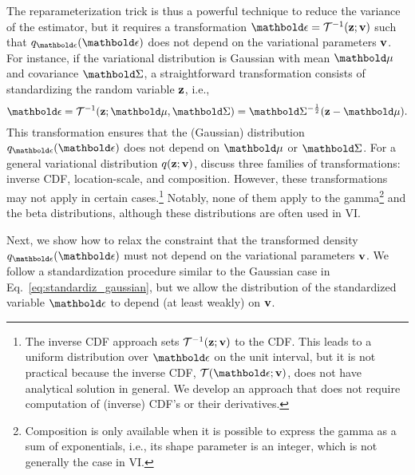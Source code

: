 The reparameterization trick is thus a powerful technique to reduce the variance of the estimator, but it requires a transformation $\beps=\Tcal^{-1}(\bz;\bv)$ such that $q_{\beps}(\beps)$ does not depend on the variational parameters $\mathbf{v}$. For instance, if the variational distribution is Gaussian with mean $\bmu$ and covariance $\bSigma$, a straightforward transformation consists of standardizing the random variable $\mathbf{z}$, i.e.,
\begin{equation}\label{eq:standardiz_gaussian}
	\beps=\Tcal^{-1}(\bz;\bmu,\bSigma)=\bSigma^{-\frac{1}{2}}(\bz-\bmu).
\end{equation}
This transformation ensures that the (Gaussian) distribution $q_{\beps}(\beps)$ does not depend on $\bmu$ or $\bSigma$. For a general variational distribution $q(\mathbf{z};\mathbf{v})$, \citet{Kingma2014} discuss three families of transformations: inverse \gls{CDF}, location-scale, and composition. However, these transformations may not apply in certain cases.\footnote{The inverse \gls{CDF} approach sets $\mathcal{T}^{-1}(\mathbf{z};\mathbf{v})$ to the \gls{CDF}. This leads to a uniform distribution over $\beps$ on the unit interval, but it is not practical because the inverse \gls{CDF}, $\Tcal(\beps;\bv)$, does not have analytical solution in general. We develop an approach that does not require computation of (inverse) \gls{CDF}'s or their derivatives.}
Notably, none of them apply to the gamma\footnote{Composition is only available when it is possible to express the gamma as a sum of exponentials, i.e., its shape parameter is an integer, which is not generally the case in \gls{VI}.} and the beta distributions, although these distributions are often used in \gls{VI}.



Next, we show how to relax the constraint that the transformed density $q_{\beps}(\beps)$ must not depend on the variational parameters $\mathbf{v}$. We follow a standardization procedure similar to the Gaussian case in Eq.~\ref{eq:standardiz_gaussian}, but we allow the distribution of the standardized variable $\beps$ to depend (at least weakly) on $\mathbf{v}$.
